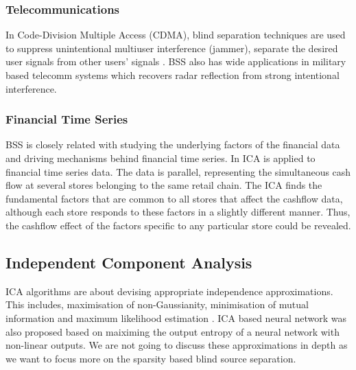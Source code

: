 \subsubsection{Telecommunications} 
In Code-Division Multiple Access (CDMA), blind separation techniques are used to suppress unintentional multiuser interference (jammer), separate the desired user signals from other users' signals \cite{Raju2006}. BSS also has wide applications in military based telecomm systems which recovers radar reflection from strong intentional interference.

\subsubsection{Financial Time Series}
BSS is closely related with studying the underlying factors of the financial data and driving mechanisms behind financial time series. In \cite{OjaE2000Icaf} ICA is applied to financial time series data. The data is parallel, representing the simultaneous cash flow at several stores belonging to the same retail chain. The ICA finds the fundamental factors that are common to all stores that affect the cashflow data, although each store responds to these factors in a slightly different manner. Thus, the cashflow effect of the factors specific to any particular store could be revealed.
\newpage

\subsection{Independent Component Analysis}
ICA algorithms are about devising appropriate independence approximations. This includes, maximisation of non-Gaussianity, minimisation of mutual information and maximum likelihood estimation \cite{HYVARINEN2000411}. ICA based neural network \cite{Bell1995AnIA} was also proposed based on maiximing the output entropy of a neural network with non-linear outputs. We are not going to discuss these approximations in depth as we want to focus more on the sparsity based blind source separation. 
